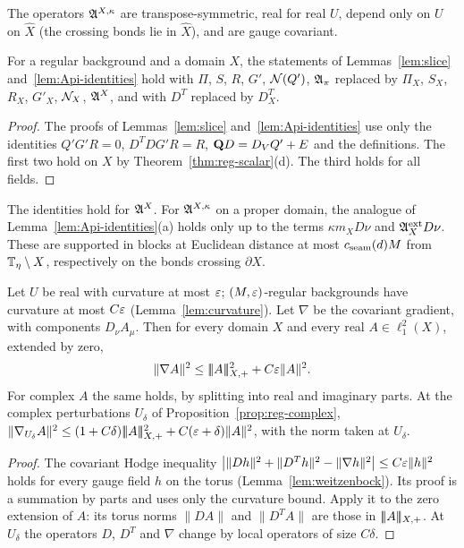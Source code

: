 The operators $\mathfrak A^{X,\kappa}$ are transpose-symmetric, real for real $U$, depend only on $U$ on $\hat X$ (the crossing bonds lie in $\hat X$), and are gauge covariant.

\begin{lemma}\label{lem:domain-identities}
For a regular background and a domain $X$, the statements of Lemmas~\ref{lem:slice} and~\ref{lem:Api-identities} hold with $\Pi$, $S$, $R$, $G'$, $\mathcal N(Q')$, $\mathfrak A_\pi$ replaced by $\Pi_X$, $S_X$, $R_X$, $G'_X$, $\mathcal N_X$, $\mathfrak A^X$, and with $D^T$ replaced by $D^T_X$.
\end{lemma}

\begin{proof}
The proofs of Lemmas~\ref{lem:slice} and~\ref{lem:Api-identities} use only the identities $Q'G'R=0$, $D^TDG'R=R$, $\mathbf Q D=D_VQ'+E$ and the definitions. The first two hold on $X$ by Theorem~\ref{thm:reg-scalar}(d). The third holds for all fields.
\end{proof}

The identities hold for $\mathfrak A^X$. For $\mathfrak A^{X,\kappa}$ on a proper domain, the analogue of Lemma~\ref{lem:Api-identities}(a) holds only up to the terms $\kappa m_XD\nu$ and $\mathfrak A^{\rm ext}_XD\nu$. These are supported in blocks at Euclidean distance at most $c_{\rm seam}(d)M$ from $\mathbb T_\eta\setminus X$, respectively on the bonds crossing $\partial X$.

\begin{lemma}\label{lem:full-gradient}
Let $U$ be real with curvature at most $\varepsilon$; $(M,\varepsilon)$-regular backgrounds have curvature at most $C\varepsilon$ (Lemma~\ref{lem:curvature}). Let $\nabla$ be the covariant gradient, with components $D_\nu A_\mu$. Then for every domain $X$ and every real $A\in\ell^2_1(X)$, extended by zero,
\[
\|\nabla A\|^2\le|\!|\!|A|\!|\!|_{X,+}^2+C\varepsilon\|A\|^2 .
\]
For complex $A$ the same holds, by splitting into real and imaginary parts. At the complex perturbations $U_\delta$ of Proposition~\ref{prop:reg-complex}, $\|\nabla_{U_\delta}A\|^2\le(1+C\delta)|\!|\!|A|\!|\!|_{X,+}^2+C(\varepsilon+\delta)\|A\|^2$, with the norm taken at $U_\delta$.
\end{lemma}

\begin{proof}
The covariant Hodge inequality $\big|\|Dh\|^2+\|D^Th\|^2-\|\nabla h\|^2\big|\le C\varepsilon\|h\|^2$ holds for every gauge field $h$ on the torus (Lemma~\ref{lem:weitzenbock}). Its proof is a summation by parts and uses only the curvature bound. Apply it to the zero extension of $A$: its torus norms $\|DA\|$ and $\|D^TA\|$ are those in $|\!|\!|A|\!|\!|_{X,+}$. At $U_\delta$ the operators $D$, $D^T$ and $\nabla$ change by local operators of size $C\delta$.
\end{proof}

